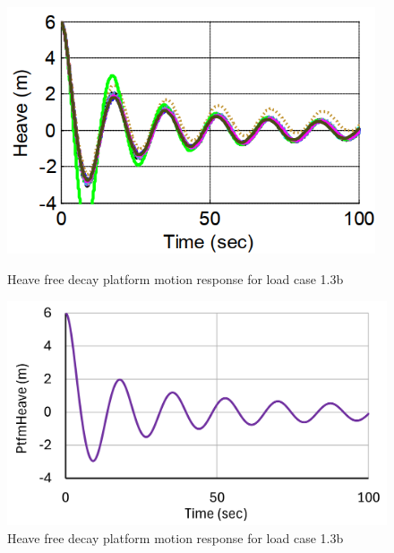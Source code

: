 \documentclass[a4paper, 11pt]{article}
\begin{document}
\begin{figure}[H]
    \begin{minipage}{0.47\textwidth}
        \centering
        \includegraphics[width=0.97\textwidth]{1.3b_heave.png}
        \caption{\small Heave free decay platform motion response for load case 1.3b \cite{Robertson2014}}
        \label{fig:1.3b_heave}
    \end{minipage}
    \hfill
    \begin{minipage}{0.5\textwidth}
        \centering
        \includegraphics[width=1\textwidth]{1.3b_heave_mine.png}
        \caption{\small Heave free decay platform motion response for load case 1.3b}
        \label{fig:1.3b_heave_mine}
    \end{minipage}
\end{figure}
\end{document}
